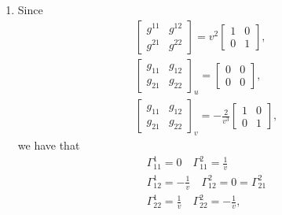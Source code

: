 \documentclass[a4paper,12pt]{article}
\theoremstyle{remark}
\begin{document}
\begin{enumerate}
\begin{enumerate}
            \item
                Since
                \begin{gather*}
                    \left[ \begin{array}{cc}
                            g^{11} & g^{12} \\
                            g^{21} & g^{22}
                    \end{array} \right]
                    = v^2
                    \left[ \begin{array}{cc}
                            1 & 0 \\
                            0 & 1
                    \end{array} \right], \\
                    \left[ \begin{array}{cc}
                            g_{11} & g_{12} \\
                            g_{21} & g_{22}
                    \end{array} \right]_u
                    = \left[ \begin{array}{cc}
                            0 & 0 \\
                            0 & 0
                    \end{array} \right], \\
                    \left[ \begin{array}{cc}
                            g_{11} & g_{12} \\
                            g_{21} & g_{22}
                    \end{array} \right]_v
                    = -\frac{2}{v^3}
                    \left[ \begin{array}{cc}
                            1 & 0 \\
                            0 & 1
                    \end{array} \right],
                \end{gather*}
                we have that
                \begin{gather*}
                    \Gamma_{11}^1 = 0 \quad
                    \Gamma_{11}^2 = \frac{1}{v} \\
                    \Gamma_{12}^1 = -\frac{1}{v} \quad
                    \Gamma_{12}^2 = 0 = \Gamma_{21}^2 \\
                    \Gamma_{22}^1 = \frac{1}{v} \quad
                    \Gamma_{22}^2 = -\frac{1}{v},
                \end{gather*}

\end{enumerate}
\end{enumerate}
\end{document}
